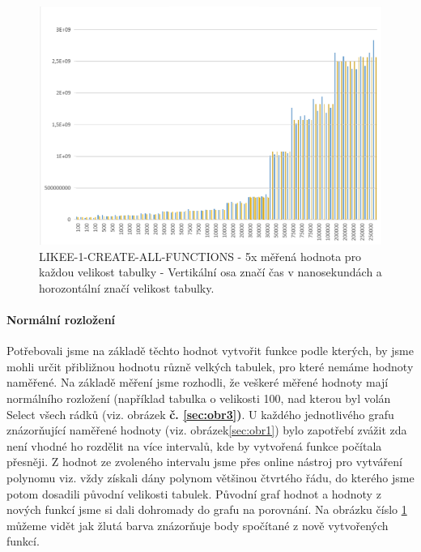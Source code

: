 \documentclass[a4paper, 11pt]{article}
\begin{document}
\begin{figure}[H]
\centering
\includegraphics[width=150mm, frame]{images/LIKEE-1-CREATE-ALL-FUNCTIONS.png}
\caption{LIKEE-1-CREATE-ALL-FUNCTIONS - 5x měřená hodnota pro každou velikost tabulky - Vertikální osa značí čas v nanosekundách a horozontální značí velikost tabulky.}
\label{sec:obr2}
\end{figure}

\paragraph{Normální rozložení} Potřebovali jsme na základě těchto hodnot vytvořit funkce podle kterých, by jsme mohli určit přibližnou hodnotu různě velkých tabulek, pro které nemáme hodnoty naměřené. Na základě měření jsme rozhodli, že veškeré měřené hodnoty mají normálního rozložení (například tabulka o velikosti 100, nad kterou byl volán Select všech rádků (viz. obrázek \textbf{č. \ref{sec:obr3})}.
U každého jednotlivého grafu znázorňující naměřené hodnoty (viz. obrázek\ref{sec:obr1}) bylo zapotřebí zvážit zda není vhodné ho rozdělit na více intervalů, kde by  vytvořená funkce počítala přesněji. Z hodnot ze zvoleného intervalu jsme přes online nástroj pro vytváření polynomu viz. \cite{polregres} vždy získali dány polynom většinou čtvrtého řádu, do kterého jsme potom dosadili původní velikosti tabulek. Původní graf hodnot a hodnoty z nových funkcí jsme si dali dohromady do grafu na porovnání. Na obrázku číslo \ref{sec:obr2} můžeme vidět jak žlutá barva znázorňuje body spočítané z nově vytvořených funkcí. 
\end{document}
